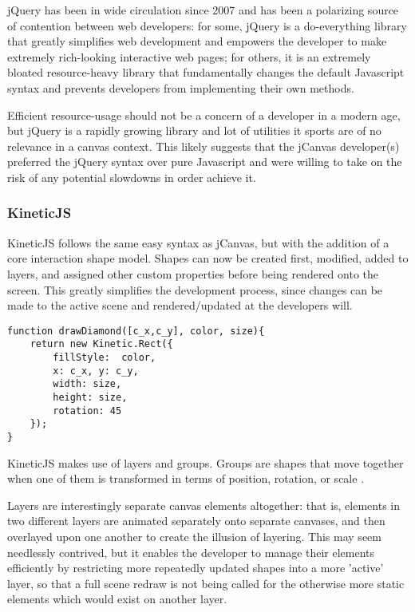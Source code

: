 jQuery has been in wide circulation since 2007 and has been a polarizing source of contention between web developers: for some, jQuery is a do-everything library that greatly simplifies web development and empowers the developer to make extremely rich-looking interactive web pages; for others, it is an extremely bloated resource-heavy library that fundamentally changes the default Javascript syntax and prevents developers from implementing their own methods.

Efficient resource-usage should not be a concern of a developer in a modern age, but jQuery is a rapidly growing library  and lot of utilities it sports are of no relevance in a canvas context. This likely suggests that the jCanvas developer(s) preferred the jQuery syntax over pure Javascript and were willing to take on the risk of any potential slowdowns in order achieve it.


\subsubsection{KineticJS}

KineticJS follows the same easy syntax as jCanvas, but with the addition of a core interaction shape model. Shapes can now be created first, modified, added to layers, and assigned other custom properties before being rendered onto the screen. This greatly simplifies the development process, since changes can be made to  the active scene and rendered/updated at the developers will. 

\begingroup
\begin{spacing}{1}
\begin{lstlisting}[label=code:kineticjs]
function drawDiamond([c_x,c_y], color, size){
	return new Kinetic.Rect({
		fillStyle:  color,
		x: c_x,	y: c_y,
		width: size,
		height: size,
		rotation: 45
	});
}
\end{lstlisting}
\vspace{-10pt}
\end{spacing}
\endgroup

KineticJS makes use of layers and groups. Groups are shapes that move together when one of them is transformed in terms of position, rotation, or scale \cite{kineticjs}. 

Layers are interestingly separate canvas elements altogether: that is, elements in two different layers are animated separately onto separate canvases, and then overlayed upon one another to create the illusion of layering.
This may seem needlessly contrived, but it enables the developer to manage their elements efficiently by restricting more repeatedly updated shapes into a more 'active' layer, so that a full scene redraw is not being called for the otherwise more static elements which would exist on another layer.

